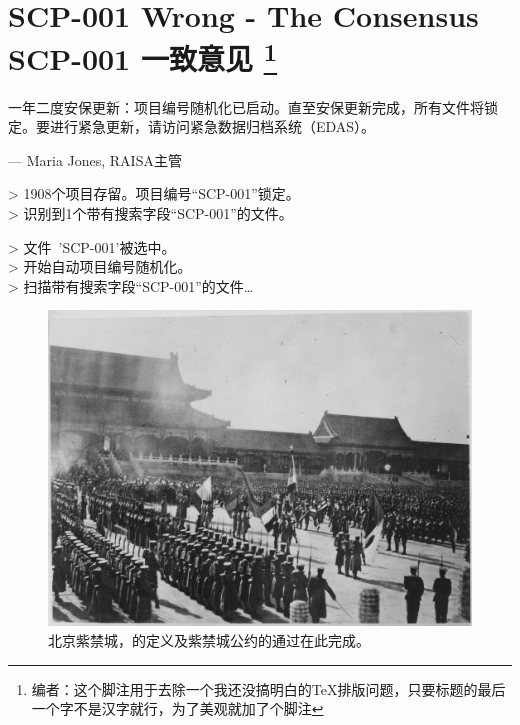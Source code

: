 \chapter[SCP-001 一致意见]{
	SCP-001 Wrong - The Consensus \\
	SCP-001 一致意见
	\footnote{编者\QIS：这个脚注用于去除一个我还没搞明白的\TeX 排版问题，只要标题的最后一个字不是汉字就行，为了美观就加了个脚注}
}

\label{chap:SCP-001.the.consensus}


\begin{scpbox}[colback=ftwoftwoctwo, center upper]


一年二度安保更新：项目编号随机化已启动。直至安保更新完成，所有文件将锁定。要进行紧急更新，请访问紧急数据归档系统（EDAS）。

— Maria Jones, RAISA主管

\end{scpbox}

\hr

\begin{scpboxcmd}

> 1908个项目存留。项目编号“SCP-001”锁定。 \\
> 识别到1个带有搜索字段“SCP-001”的文件。

> 文件~'SCP-001'被选中。 \\
> 开始自动项目编号随机化。 \\
> 扫描带有搜索字段“SCP-001”的文件…

\end{scpboxcmd}

\hr

\begin{figure}[H]
	\centering
	\includegraphics{images/SCP.001.the.consensus.jpg}
	\caption*{北京紫禁城，的定义及紫禁城公约的通过在此完成。}
\end{figure}

